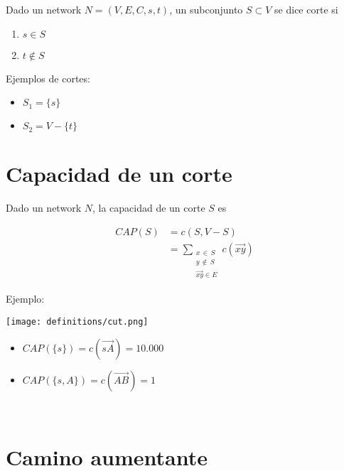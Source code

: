 \documentclass[10pt,a4paper]{article}
\begin{document}
Dado un network $N=(V, E, C, s, t)$, un subconjunto $S \subset V$ se dice corte si

\begin{enumerate}

	\item $s\in S$
	\item $t\not \in S$
\end{enumerate}

Ejemplos de cortes:

\begin{itemize}

	\item $S_1 = \{s\}$
	\item $S_2 = V - \{t\}$
\end{itemize}

\section*{Capacidad de un corte}

Dado un network $N$, la capacidad de un corte $S$ es

\begin{center}
\begin{align*} CAP(S) &= c(S, V-S)\\ &= \sum\limits_{\substack{x\,\in\,S \\ y \,\not \in\,S\\ \overrightarrow{xy}\in E }} c(\overrightarrow{xy} ) \end{align*} 
\end{center}

Ejemplo:

\begin{center}

    \begin{adjustbox}{max size={\textwidth}{\textheight}}
        \texttt{[image: definitions/cut.png]}
        \end{adjustbox}
    
\end{center}

\begin{itemize}

	\item $CAP(\{s\}) = c(\overrightarrow{sA}) = 10.000$
	\item $CAP(\{s, A\}) = c(\overrightarrow{AB}) = 1$
\end{itemize}

 

\section*{Camino aumentante}
\end{document}
